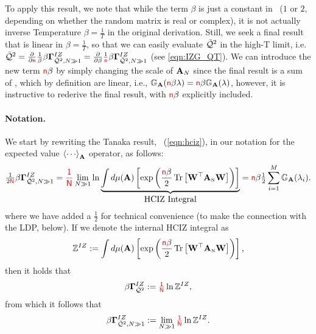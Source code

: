 To apply this result, we note that
while the term $\beta$ is just a constant in~\cite{Tanaka2008}
($1$ or $2$, depending on whether the random matrix is real or complex),
it is not actually inverse Temperature $\beta=\tfrac{1}{T}$ in the original derivation.
Still, we seek a final result that is linear in $\beta=\tfrac{1}{T}$,
so that we can easily evaluate $\bar{\mathcal{Q}}^{2}$ in the high-T limit, i.e.
$\bar{\mathcal{Q}}^{2}
=\tfrac{\partial}{\partial {\color{red}\sf{n}}}\tfrac{1}{\beta}\beta\mathbf{\Gamma}^{IZ}_{\bar{\mathcal{Q}}^{2},N\gg 1}
=\tfrac{\partial}{\partial \beta}\tfrac{1}{{\color{red}\sf{n}}}\beta\mathbf{\Gamma}^{IZ}_{\bar{\mathcal{Q}}^{2},N\gg 1}$
(see \ref{eqn:IZG_QT}).
We can introduce the new term ${\color{red}\sf{n}}\beta$ by
simply changing the scale of $\mathbf{A}_N$ since the final result is a sum of \RTransforms, which by definition
are linear, i.e., $\mathbb{G}_{\mathbf{A}}({\color{red}\sf{n}}\beta\lambda)={\color{red}\sf{n}}\beta \mathbb{G}_{\mathbf{A}}(\lambda)$, however, it is instructive
to rederive the final result, with ${\color{red}\sf{n}}\beta$ explicitly included.



\paragraph{Notation.}

We start by rewriting the Tanaka result, \EQN~(\ref{eqn:hciz}),
in our notation for the expected value $\Expected[\AMAT]{\cdots}$ operator, as follows:
\begin{equation}
\label{eqn:hciz2}
  \tfrac{1}{2{\color{red}\sf{N}}}\beta\mathbf{\Gamma}^{IZ}_{\bar{\mathcal{Q}}^{2},N\gg 1} = 
  {\color{red}\sf{\frac{1}{N}}}\lim_{N\gg 1} \ln \underbrace{ \int d\mu(\mathbf{\mathbf{A}})\left[\exp\left(\frac{{\color{red}\sf{n}}\beta}{2}\mbox{}\operatorname{Tr}\left[\mathbf{W}^{\top}{\mathbf{A}}_{\text{\tiny N}}\mathbf{W}\right]\right)\right] }_{\mbox{HCIZ Integral}} 
  = {\color{red}\sf{n}}\beta \tfrac{1}{2}\sum_{i=1}^{M}\mathbb{G}_{\mathbf{A}}(\lambda_{i})   .
\end{equation}
where we have added a $\tfrac{1}{2}$ for technical convenience (to make the connection with the LDP, below).
If we denote the internal HCIZ integral as 
\begin{equation}
\label{eqn:hciz_def}
  \mathbb{Z}^{IZ} := \int d\mu(\mathbf{\mathbf{A}})\left[\exp\left(\frac{{\color{red}\sf{n}}\beta}{2}\mbox{}\operatorname{Tr}\left[\mathbf{W}^{\top}{\mathbf{A}}_{\text{\tiny N}}\mathbf{W}\right]\right)\right]  ,
 \end{equation}
then it holds that 
\begin{equation}
  \label{eqn:hciz_def2}
  \beta\mathbf{\Gamma}^{IZ}_{\bar{\mathcal{Q}}^{2}} :=  {\color{red}\sf{\tfrac{1}{N}}}\ln\mathbb{Z}^{IZ}  ,
\end{equation}
from which it follows that %
\begin{equation}
\label{eqn:hciz_def3}
  \beta\mathbf{\Gamma}^{IZ}_{\bar{\mathcal{Q}}^{2},N\gg 1} := \lim_{N \gg 1} {\color{red}\sf{\tfrac{1}{N}}}\ln\mathbb{Z}^{IZ}  .
\end{equation}

